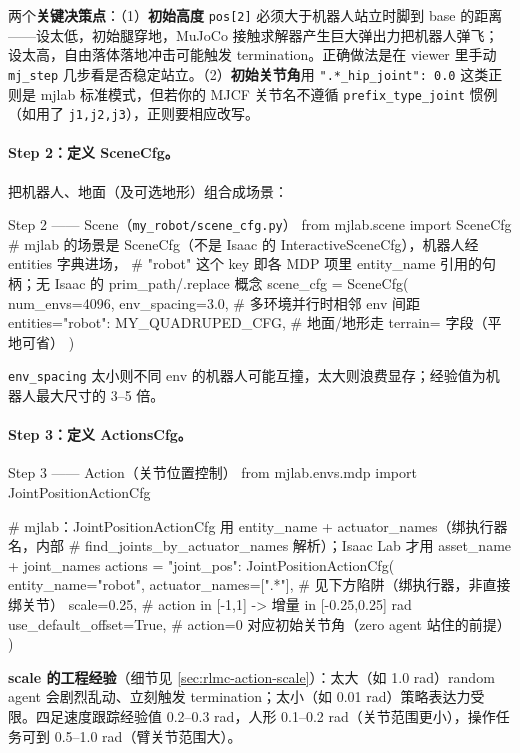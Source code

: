 两个\textbf{关键决策点}：（1）\textbf{初始高度} \verb|pos[2]| 必须大于机器人站立时脚到 base 的距离——设太低，初始腿穿地，MuJoCo 接触求解器产生巨大弹出力把机器人弹飞；设太高，自由落体落地冲击可能触发 termination。正确做法是在 viewer 里手动 \verb|mj_step| 几步看是否稳定站立。（2）\textbf{初始关节角}用 \verb|".*_hip_joint": 0.0| 这类正则是 mjlab 标准模式，但若你的 MJCF 关节名不遵循 \verb|prefix_type_joint| 惯例（如用了 \verb|j1,j2,j3|），正则要相应改写。

\paragraph{Step 2：定义 SceneCfg。}把机器人、地面（及可选地形）组合成场景：

\begin{codebox}[Python]{Step 2 —— Scene（\texttt{my\_robot/scene\_cfg.py}）}
from mjlab.scene import SceneCfg
# mjlab 的场景是 SceneCfg（不是 Isaac 的 InteractiveSceneCfg），机器人经 entities 字典进场，
# "robot" 这个 key 即各 MDP 项里 entity_name 引用的句柄；无 Isaac 的 prim_path/.replace 概念
scene_cfg = SceneCfg(
    num_envs=4096,
    env_spacing=3.0,                           # 多环境并行时相邻 env 间距
    entities={"robot": MY_QUADRUPED_CFG},      # 地面/地形走 terrain= 字段（平地可省）
)
\end{codebox}

\verb|env_spacing| 太小则不同 env 的机器人可能互撞，太大则浪费显存；经验值为机器人最大尺寸的 3--5 倍。

\paragraph{Step 3：定义 ActionsCfg。}

\begin{codebox}[Python]{Step 3 —— Action（关节位置控制）}
from mjlab.envs.mdp import JointPositionActionCfg

# mjlab：JointPositionActionCfg 用 entity_name + actuator_names（绑执行器名，内部
#   find_joints_by_actuator_names 解析）；Isaac Lab 才用 asset_name + joint_names
actions = {"joint_pos": JointPositionActionCfg(
    entity_name="robot",
    actuator_names=[".*"],       # 见下方陷阱（绑执行器，非直接绑关节）
    scale=0.25,                  # action in [-1,1] -> 增量 in [-0.25,0.25] rad
    use_default_offset=True,     # action=0 对应初始关节角（zero agent 站住的前提）
)}
\end{codebox}

\textbf{scale 的工程经验}（细节见 \cref{sec:rlmc-action-scale}）：太大（如 1.0 rad）random agent 会剧烈乱动、立刻触发 termination；太小（如 0.01 rad）策略表达力受限。四足速度跟踪经验值 0.2--0.3 rad，人形 0.1--0.2 rad（关节范围更小），操作任务可到 0.5--1.0 rad（臂关节范围大）。

